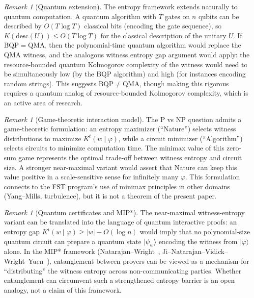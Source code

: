 \documentclass[aps,prd,twocolumn,superscriptaddress,nofootinbib]{revtex4-2}
\theoremstyle{definition}
\theoremstyle{remark}
\newtheorem{remark}[theorem]{Remark}
\begin{document}
\begin{remark}[Quantum extension]
\label{rem:quantum}
The entropy framework extends naturally to quantum computation. A quantum algorithm with $T$ gates on $n$ qubits can be described by $O(T \log T)$ classical bits (encoding the gate sequence), so $K(\mathrm{desc}(U)) \leq O(T \log T)$ for the classical description of the unitary $U$. If $\mathrm{BQP} = \mathrm{QMA}$, then the polynomial-time quantum algorithm would replace the QMA witness, and the analogous witness entropy gap argument would apply: the resource-bounded quantum Kolmogorov complexity of the witness would need to be simultaneously low (by the BQP algorithm) and high (for instances encoding random strings). This suggests $\mathrm{BQP} \neq \mathrm{QMA}$, though making this rigorous requires a quantum analog of resource-bounded Kolmogorov complexity, which is an active area of research.
\end{remark}

\begin{remark}[Game-theoretic interaction model]
\label{rem:game-theoretic}
The P vs NP question admits a game-theoretic formulation: an entropy maximizer (``Nature'') selects witness distributions to maximize $K^t(w \mid \varphi)$, while a circuit minimizer (``Algorithm'') selects circuits to minimize computation time. The minimax value of this zero-sum game represents the optimal trade-off between witness entropy and circuit size. A stronger near-maximal variant would assert that Nature can keep this value positive in a scale-sensitive sense for infinitely many $\varphi$. This formulation connects to the FST program's use of minimax principles in other domains (Yang--Mills, turbulence), but it is not a theorem of the present paper.
\end{remark}

\begin{remark}[Quantum certificates and MIP*]
\label{rem:quantum-certificates}
The near-maximal witness-entropy variant can be translated into the language of quantum interactive proofs: an entropy gap $K^t(w \mid \varphi) \geq |w| - O(\log n)$ would imply that no polynomial-size quantum circuit can prepare a quantum state $|\psi_w\rangle$ encoding the witness from $|\varphi\rangle$ alone. In the MIP* framework (Natarajan--Wright~\cite{NatarajanWright2019}, Ji--Natarajan--Vidick--Wright--Yuen~\cite{JiNatarajanVidickWrightYuen2021}), entanglement between provers can be viewed as a mechanism for ``distributing'' the witness entropy across non-communicating parties. Whether entanglement can circumvent such a strengthened entropy barrier is an open analogy, not a claim of this framework.
\end{remark}
\end{document}
